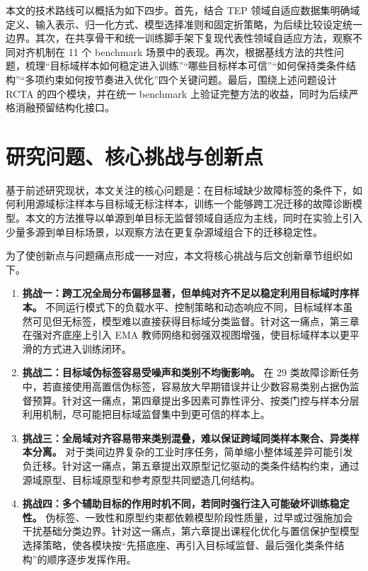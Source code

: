 本文的技术路线可以概括为如下四步。首先，结合 TEP 领域自适应数据集明确域定义、输入表示、归一化方式、模型选择准则和固定折策略，为后续比较设定统一边界。其次，在共享骨干和统一训练脚手架下复现代表性领域自适应方法，观察不同对齐机制在 11 个 benchmark 场景中的表现。再次，根据基线方法的共性问题，梳理“目标域样本如何稳定进入训练”“哪些目标样本可信”“如何保持类条件结构”“多项约束如何按节奏进入优化”四个关键问题。最后，围绕上述问题设计 RCTA 的四个模块，并在统一 benchmark 上验证完整方法的收益，同时为后续严格消融预留结构化接口。

\section{研究问题、核心挑战与创新点}
基于前述研究现状，本文关注的核心问题是：在目标域缺少故障标签的条件下，如何利用源域标注样本与目标域无标注样本，训练一个能够跨工况迁移的故障诊断模型。本文的方法推导以单源到单目标无监督领域自适应为主线，同时在实验上引入少量多源到单目标场景，以观察方法在更复杂源域组合下的迁移稳定性。

为了使创新点与问题痛点形成一一对应，本文将核心挑战与后文创新章节组织如下。

\begin{enumerate}
\item \textbf{挑战一：跨工况全局分布偏移显著，但单纯对齐不足以稳定利用目标域时序样本。} 不同运行模式下的负载水平、控制策略和动态响应不同，目标域样本虽然可见但无标签，模型难以直接获得目标域分类监督。针对这一痛点，第三章在强对齐底座上引入 EMA 教师网络和弱强双视图增强，使目标域样本以更平滑的方式进入训练闭环。
\item \textbf{挑战二：目标域伪标签容易受噪声和类别不均衡影响。} 在 29 类故障诊断任务中，若直接使用高置信伪标签，容易放大早期错误并让少数容易类别占据伪监督预算。针对这一痛点，第四章提出多因素可靠性评分、按类门控与样本分层利用机制，尽可能把目标域监督集中到更可信的样本上。
\item \textbf{挑战三：全局域对齐容易带来类别混叠，难以保证跨域同类样本聚合、异类样本分离。} 对于类间边界复杂的工业时序任务，简单缩小整体域差异可能引发负迁移。针对这一痛点，第五章提出双原型记忆驱动的类条件结构约束，通过源域原型、目标域原型和参考原型共同塑造几何结构。
\item \textbf{挑战四：多个辅助目标的作用时机不同，若同时强行注入可能破坏训练稳定性。} 伪标签、一致性和原型约束都依赖模型阶段性质量，过早或过强施加会干扰基础分类边界。针对这一痛点，第六章提出课程化优化与置信保护型模型选择策略，使各模块按“先搭底座、再引入目标域监督、最后强化类条件结构”的顺序逐步发挥作用。
\end{enumerate}

